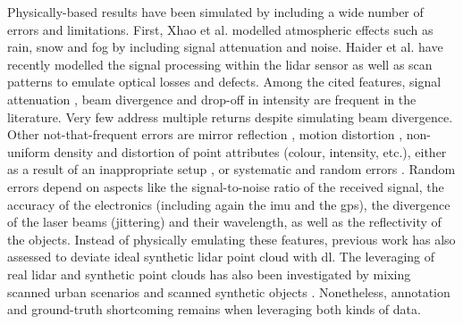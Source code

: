 Physically-based results have been simulated by including a wide number of errors and limitations. First, Xhao et al. \cite{zhao_method_2021} modelled atmospheric effects such as rain, snow and fog by including signal attenuation and noise. Haider et al. \cite{haider_development_2022} have recently modelled the signal processing within the \acrshort{lidar} sensor as well as scan patterns to emulate optical losses and defects. Among the cited features, signal attenuation \cite{dosovitskiy_carla_2017, bechtold_helios_2016, hanke_generation_2017}, beam divergence \cite{zhao_method_2021, bechtold_helios_2016, hanke_generation_2017, haider_development_2022} and drop-off in intensity \cite{ahn_real-time_2020} are frequent in the literature. Very few address multiple returns \cite{winiwarter_virtual_2022} despite simulating beam divergence. Other not-that-frequent errors are mirror reflection \cite{ullrich_advances_2019}, motion distortion \cite{chen_analysis_2022}, non-uniform density and distortion of point attributes (colour, intensity, etc.), either as a result of an inappropriate setup \cite{dimitrov_segmentation_2015}, or systematic and random errors \cite{isheil_systematic_2011, fan_error_2015, pandzic_error_2017}. Random errors depend on aspects like the signal-to-noise ratio of the received signal, the accuracy of the electronics (including again the \acrshort{imu} and the \acrshort{gps}), the divergence of the laser beams (jittering) and their wavelength, as well as the reflectivity of the objects. Instead of physically emulating these features, previous work has also assessed to deviate ideal synthetic \acrshort{lidar} point cloud with \acrshort{dl}\cite{manivasagam_lidarsim_2020, xiao_synlidar_2021, guillard_learning_2022}. The leveraging of real \acrshort{lidar} and synthetic point clouds has also been investigated by mixing scanned urban scenarios and scanned synthetic objects \cite{manivasagam_lidarsim_2020}. Nonetheless, annotation and ground-truth shortcoming remains when leveraging both kinds of data.

